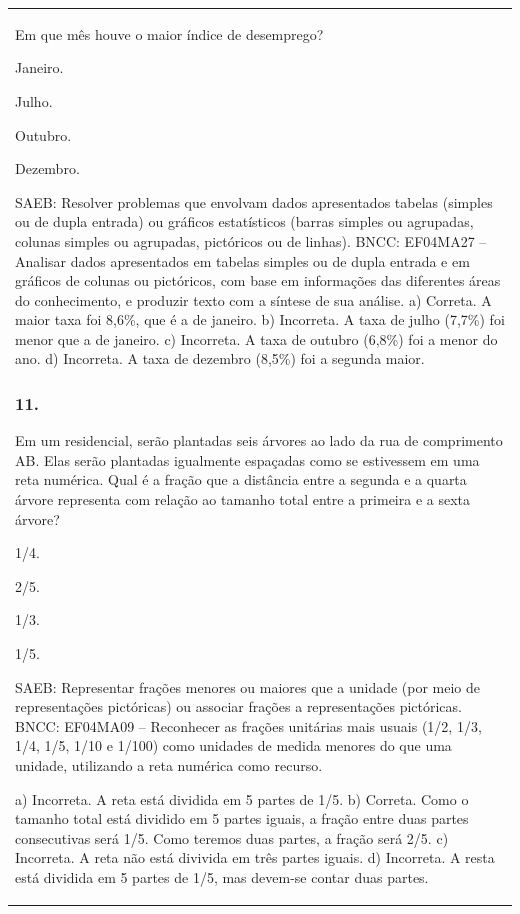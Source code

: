 \begin{mdframed}[linewidth=2pt,linecolor=salmao,roundcorner=2pt]
\begin{escolha}
{{{\begin{longtable}[]{@{}l@{}}
\begin{itemize}
{Em que mês houve o maior índice de desemprego?

\begin{escolha}
\item
  Janeiro.
\item
  Julho.
\item
  Outubro.
\item
  Dezembro.
\end{escolha}

SAEB: Resolver problemas que envolvam dados apresentados
tabelas (simples ou de dupla entrada) ou gráficos estatísticos (barras
simples ou agrupadas, colunas simples ou agrupadas, pictóricos ou de
linhas).
BNCC: EF04MA27 -- Analisar dados apresentados em tabelas simples ou de dupla entrada e em gráficos de
colunas ou pictóricos, com base em informações das diferentes áreas do conhecimento, e produzir
texto com a síntese de sua análise.
a) Correta. A maior taxa foi 8,6\%, que é a de janeiro.
b) Incorreta. A taxa de julho (7,7\%) foi menor que a de janeiro.
c) Incorreta. A taxa de outubro (6,8\%) foi a menor do ano.
d) Incorreta. A taxa de dezembro (8,5\%) foi a segunda maior.

\subsubsection{11.}

Em um residencial, serão plantadas seis árvores ao lado da rua de comprimento AB. Elas
serão plantadas igualmente espaçadas como se estivessem em uma reta numérica.
Qual é a fração que a distância entre a segunda e a quarta árvore
representa com relação ao tamanho total entre a primeira e a sexta árvore?

\begin{escolha}
\item
  1/4.
\item
  2/5.
\item
  1/3.
\item
  1/5.
\end{escolha}

SAEB: Representar frações menores ou maiores que a unidade
(por meio de representações pictóricas) ou associar frações a
representações pictóricas.
BNCC: EF04MA09 -- Reconhecer as frações unitárias mais usuais (1/2, 1/3, 1/4, 1/5, 1/10 e 1/100) como
unidades de medida menores do que uma unidade, utilizando a reta numérica como recurso.

a) Incorreta. A reta está dividida em 5 partes de 1/5.
b) Correta. Como o tamanho total está dividido em 5 partes iguais, a fração entre
duas partes consecutivas será 1/5. Como teremos duas partes, a fração
será 2/5.
c) Incorreta. A reta não está divivida em três partes iguais.
d) Incorreta. A resta está dividida em 5 partes de 1/5, mas devem-se contar duas partes.

}
\end{itemize}
\end{longtable}}}}
\end{escolha}
\end{mdframed}
